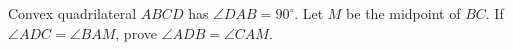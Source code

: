 Convex quadrilateral $ABCD$ has $\angle DAB=90^\circ$. Let $M$ be the midpoint of $BC$. If $\angle ADC=\angle BAM$, prove $\angle ADB=\angle CAM$.
